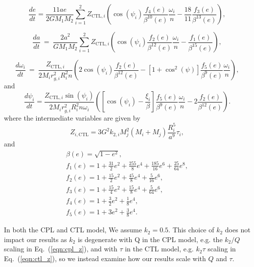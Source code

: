 \documentclass[twocolumn]{aastex61}
\begin{document}
\begin{equation} \label{eqn:ctl_e}
  \frac{de}{dt} = \frac{11 ae}{2 G M_1 M_2}
  \sum_{i = 1}^2 Z_{\mathrm{CTL},i} \left( \cos(\psi_i) \frac{f_4(e)}{\beta^{10}(e)}  \frac{\omega_i}{n} -\frac{18}{11} \frac{f_3(e)}{\beta^{13}(e)}\right),
\end{equation}

\begin{equation}\label{eqn:ctl_a}
  \frac{da}{dt} \ = \  \frac{2 a^2}{G M_1 M_2}
  \sum\limits_{i = 1}^2 Z_{\mathrm{CTL},i} \left( \cos(\psi_i) \frac{f_2(e)}{\beta^{12}(e)} \frac{\omega_i}{n} - \frac{f_1(e)}{\beta^{15}(e)}\right),
\end{equation}

\begin{equation}\label{eqn:ctl_o}
  \frac{d\omega_i}{dt} \ = \ \frac{Z_{\mathrm{CTL},i}}{2 M_i r_{g,i}^2 
R_i^2 n} \left( 2 \cos(\psi_i) \frac{f_2(e)}{\beta^{12}(e)} - \left[ 1+\cos^2(\psi)
 \right] \frac{f_5(e)}{\beta^9(e)} 
\frac{\omega_i}{n} \right),  
\end{equation}
and
\begin{equation}\label{eqn:ctl_psi}
  \frac{d\psi_i}{dt} = \frac{Z_{\mathrm{CTL},i} \sin(\psi_i)}{2 M_i r_{g,i}^2 R_i^2 n \omega_i}\left( \left[ \cos(\psi_i) - \frac{\xi_i}{ \beta} \right] \frac{f_5(e)}{\beta^9(e)} \frac{\omega_i}{n} - 2 \frac{f_2(e)}{\beta^{12}(e)} \right).
\end{equation}
where the intermediate variables are given by 
\begin{equation}\label{eqn:ctl_z}
 Z_{i,\mathrm{CTL}} = 3 G^2 k_{2,i} M_j^2 (M_i+M_j) \frac{R_i^5}{a^9} \tau_i ,
\end{equation}
and 
\begin{equation}\label{eqn:ctl_f_e}
\begin{array}{l}
\beta(e) = \sqrt{1-e^2},\\
f_1(e) = 1 + \frac{31}{2} e^2 + \frac{255}{8} e^4 + \frac{185}{16} e^6 + \frac{25}{
64} e^8,\\
f_2(e) = 1 + \frac{15}{2} e^2 + \frac{45}{8} e^4 + \frac{5}{16} e^6,\\
f_3(e) = 1 + \frac{15}{4} e^2 + \frac{15}{8} e^4 + \frac{5}{64} e^6,\\
f_4(e) = 1 + \frac{3}{2} e^2 + \frac{1}{8} e^4,\\
f_5(e) = 1 + 3 e^2 + \frac{3}{8} e^4.
\end{array}
\end{equation}

In both the CPL and CTL model, We assume $k_2 = 0.5$. This choice of $k_2$ does not impact our results as $k_2$ is degenerate with Q in the CPL model, e.g. the $k_2/Q$ scaling in Eq.~(\ref{eqn:cpl_z}), and with $\tau$ in the CTL model, e.g. $k_2 \tau$ scaling in Eq.~(\ref{eqn:ctl_z}), so we instead examine how our results scale with $Q$ and $\tau$.
\end{document}
